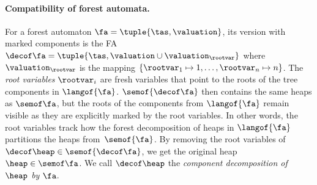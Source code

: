 {\paragraph{Compatibility of forest automata.}
For a forest automaton $\fa = \tuple{\tas,\valuation}$, its version with marked components 
is the FA 
$\decof\fa = \tuple{\tas,\valuation\cup\valuation_\rootvar}$ 
where
$\valuation_\rootvar$ is the mapping $\{\rootvar_1\mapsto
1,\ldots,\rootvar_n\mapsto n\}$.
%
%
%
The \emph{root variables} $\rootvar_i$ are fresh variables that
point to the roots of the tree components in $\langof{\fa}$. 
%
$\semof{\decof\fa}$ then contains the same heaps as $\semof\fa$, but the
roots of the components from $\langof{\fa}$ remain visible as they are explicitly marked by the root variables.
%
In other words, the root variables track how the forest decomposition of heaps
in $\langof{\fa}$ partitions the heaps from~$\semof{\fa}$. 
%
By removing the root variables of $\decof\heap\in\semof{\decof\fa}$, we get the
original heap $\heap\in\semof\fa$. We call $\decof\heap$ the \emph{component
decomposition of $\heap$ by $\fa$}.
%
%
%




}
